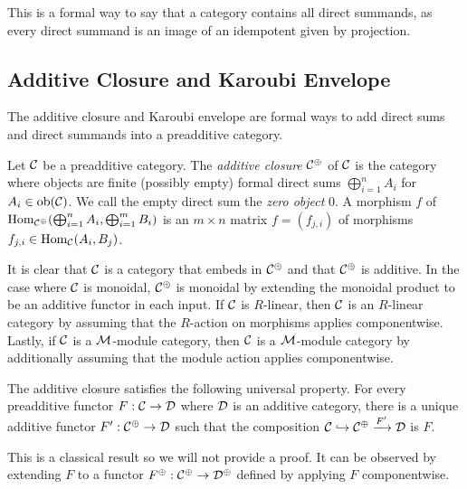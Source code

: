 This is a formal way to say that a category contains all direct summands, as every direct summand is an image of an idempotent given by projection.




\subsection*{Additive Closure and Karoubi Envelope}

The additive closure and Karoubi envelope are formal ways to add direct sums and direct summands into a preadditive category.

\begin{definition}
    Let $\mathcal{C}$ be a preadditive category. The \textit{additive closure} $\mathcal{C}^\oplus$ of $\mathcal{C}$ is the category where objects are finite (possibly empty) formal direct sums $\bigoplus_{i=1}^n A_i$ for $A_i \in \operatorname{ob}(\mathcal{C})$. We call the empty direct sum the \textit{zero object} $0$. A morphism $f$ of $\operatorname{Hom}_{\mathcal{C}^\oplus}(\bigoplus_{i=1}^n A_i, \bigoplus_{i=1}^m B_i)$ is an $m \times n$ matrix $f = (f_{j,i})$ of morphisms $f_{j,i} \in \operatorname{Hom}_{\mathcal{C}}(A_i, B_j)$.
\end{definition}

It is clear that $\mathcal{C}$ is a category that embeds in $\mathcal{C}^\oplus$ and that $\mathcal{C}^\oplus$ is additive. In the case where $\mathcal{C}$ is monoidal, $\mathcal{C}^\oplus$ is monoidal by extending the monoidal product to be an additive functor in each input. If $\mathcal{C}$ is $R$-linear, then $\mathcal{C}$ is an $R$-linear category by assuming that the $R$-action on morphisms applies componentwise. Lastly, if $\mathcal{C}$ is a $\mathcal{M}$-module category, then $\mathcal{C}$ is a $\mathcal{M}$-module category by additionally assuming that the module action applies componentwise.

\begin{lemma}
    The additive closure satisfies the following universal property. For every preadditive functor $F: \mathcal{C} \to \mathcal{D}$ where $\mathcal{D}$ is an additive category, there is a unique additive functor $F': \mathcal{C}^\oplus \to \mathcal{D}$ such that the composition $\mathcal{C} \hookrightarrow \mathcal{C}^\oplus \xrightarrow{F'} \mathcal{D}$ is $F$.
\end{lemma}

This is a classical result so we will not provide a proof. It can be observed by extending $F$ to a functor $F^\oplus: \mathcal{C}^\oplus \to \mathcal{D}^\oplus$ defined by applying $F$ componentwise.


